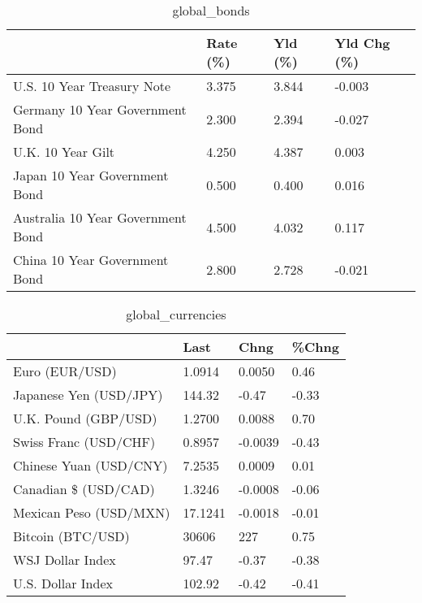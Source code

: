 \documentclass{article}%
\begin{document}
%


\begin{table}[htbp]%
\caption{global\_bonds}%
\centering%
\begin{adjustbox}{width=1\textwidth}%
\begin{tabular}{llll}
\toprule
                                  & Rate (\%) & Yld (\%) & Yld Chg (\%) \\
\midrule
       U.S. 10 Year Treasury Note &    3.375 &   3.844 &      -0.003 \\
  Germany 10 Year Government Bond &    2.300 &   2.394 &      -0.027 \\
                U.K. 10 Year Gilt &    4.250 &   4.387 &       0.003 \\
    Japan 10 Year Government Bond &    0.500 &   0.400 &       0.016 \\
Australia 10 Year Government Bond &    4.500 &   4.032 &       0.117 \\
    China 10 Year Government Bond &    2.800 &   2.728 &      -0.021 \\
\bottomrule
\end{tabular}
%
\end{adjustbox}%
\end{table}

%


\begin{table}[htbp]%
\caption{global\_currencies}%
\centering%
\begin{adjustbox}{width=1\textwidth}%
\begin{tabular}{llll}
\toprule
                       &    Last &    Chng & \%Chng \\
\midrule
        Euro (EUR/USD) &  1.0914 &  0.0050 &  0.46 \\
Japanese Yen (USD/JPY) &  144.32 &   -0.47 & -0.33 \\
  U.K. Pound (GBP/USD) &  1.2700 &  0.0088 &  0.70 \\
 Swiss Franc (USD/CHF) &  0.8957 & -0.0039 & -0.43 \\
Chinese Yuan (USD/CNY) &  7.2535 &  0.0009 &  0.01 \\
  Canadian \$ (USD/CAD) &  1.3246 & -0.0008 & -0.06 \\
Mexican Peso (USD/MXN) & 17.1241 & -0.0018 & -0.01 \\
     Bitcoin (BTC/USD) &   30606 &     227 &  0.75 \\
      WSJ Dollar Index &   97.47 &   -0.37 & -0.38 \\
     U.S. Dollar Index &  102.92 &   -0.42 & -0.41 \\
\bottomrule
\end{tabular}
%
\end{adjustbox}%
\end{table}
\end{document}
